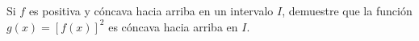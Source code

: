 \item Si $f$ es positiva y cóncava hacia arriba en un intervalo $I$, demuestre que la función $g(x) = [f(x)]^2$ es cóncava hacia arriba en $I$.
